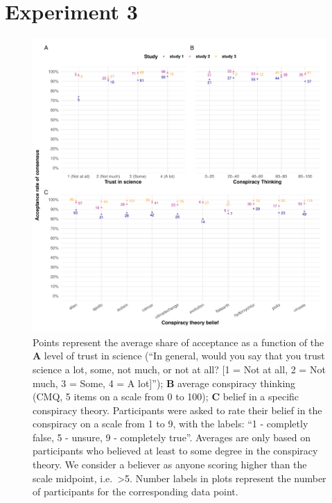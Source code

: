\documentclass[
  doc,floatsintext]{apa6}
\begin{document}
\section{Experiment 3}\label{experiment-3}



\begin{figure}
\centering
\includegraphics{output/figures/summary-plot.pdf}
\caption{\label{fig:summary-plot}Points represent the average share of acceptance as a function of the \textbf{A} level of trust in science (``In general, would you say that you trust science a lot, some, not much, or not at all? {[}1 = Not at all, 2 = Not much, 3 = Some, 4 = A lot{]}''); \textbf{B} average conspiracy thinking (CMQ, 5 items on a scale from 0 to 100); \textbf{C} belief in a specific conspiracy theory. Participants were asked to rate their belief in the conspiracy on a scale from 1 to 9, with the labels: ``1 - completly false, 5 - unsure, 9 - completely true''. Averages are only based on participants who believed at least to some degree in the conspiracy theory. We consider a believer as anyone scoring higher than the scale midpoint, i.e.~\textgreater5. Number labels in plots represent the number of participants for the corresponding data point.}
\end{figure}
\end{document}
